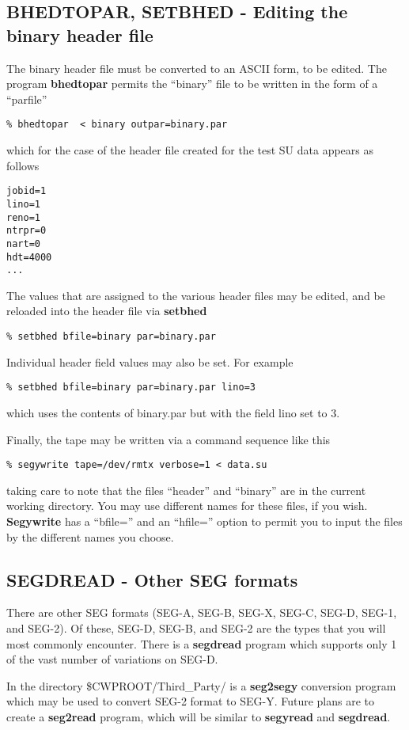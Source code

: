 {{{\subsection{BHEDTOPAR, SETBHED - Editing the binary header file}
The binary header file must be converted to an ASCII form, to be
edited.  The program {\bf bhedtopar\/} permits the ``binary'' file
to be written in the form of a ``parfile''
{\small\begin{verbatim}
% bhedtopar  < binary outpar=binary.par
\end{verbatim}}\noindent
which for the case of the header file created for the test SU data
appears as follows
{\small\begin{verbatim}
jobid=1
lino=1
reno=1
ntrpr=0
nart=0
hdt=4000
...
\end{verbatim}}\noindent
The values that are assigned to the various header files may be
edited, and be reloaded into the header file via {\bf setbhed\/}
{\small\begin{verbatim}
% setbhed bfile=binary par=binary.par
\end{verbatim}}\noindent
Individual header field values may also be set. For example
{\small\begin{verbatim}
% setbhed bfile=binary par=binary.par lino=3
\end{verbatim}}\noindent
which uses the contents of binary.par but with the field lino set to 3.

Finally, the tape may be written via a command sequence like this
{\small \begin{verbatim}
% segywrite tape=/dev/rmtx verbose=1 < data.su
\end{verbatim}} \noindent
taking care to note that the files ``header'' and ``binary'' are
in the current working directory. You may use different names
for these files, if you wish. {\bf Segywrite\/} has a ``bfile='' 
and an ``hfile='' option to permit you to input the files by
the different names you choose.

\subsection{SEGDREAD - Other SEG formats}
There are other SEG formats (SEG-A, SEG-B, SEG-X, SEG-C, SEG-D, SEG-1,
and SEG-2).
Of these, SEG-D, SEG-B, and SEG-2 are the types that you will most
commonly encounter. 
There is a {\bf segdread\/} program which supports only 1 of the vast
number of variations on SEG-D.

In the directory \$CWPROOT/Third\_Party/   is a {\bf seg2segy\/} conversion
program which may be used to convert SEG-2 format to SEG-Y.
Future plans are to create a {\bf seg2read\/} program, which will
be similar to {\bf segyread\/} and {\bf segdread\/}.

}}}
